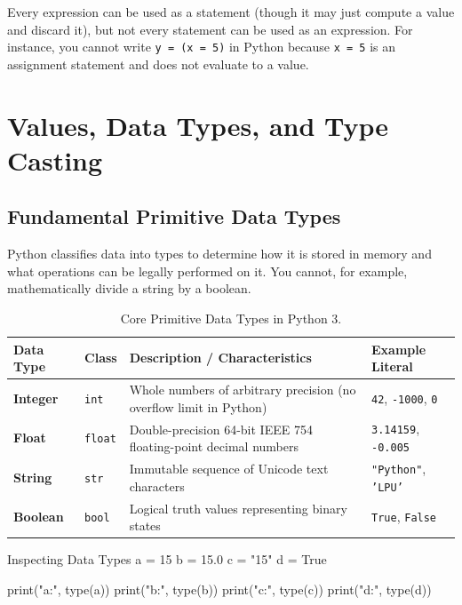 Every expression can be used as a statement (though it may just compute a value and discard it), but not every statement can be used as an expression. For instance, you cannot write \texttt{y = (x = 5)} in Python because \texttt{x = 5} is an assignment statement and does not evaluate to a value.

\section{Values, Data Types, and Type Casting}

\subsection{Fundamental Primitive Data Types}

Python classifies data into types to determine how it is stored in memory and what operations can be legally performed on it. You cannot, for example, mathematically divide a string by a boolean.

\begin{table}[htbp]
\centering
\small
\renewcommand{\arraystretch}{1.3}
\begin{tabularx}{\linewidth}{ll>{\raggedright\arraybackslash}Xl}
\toprule
\textbf{Data Type} & \textbf{Class} & \textbf{Description / Characteristics} & \textbf{Example Literal} \\
\midrule
\textbf{Integer} & \texttt{int} & Whole numbers of arbitrary precision (no overflow limit in Python) & \texttt{42}, \texttt{-1000}, \texttt{0} \\
\textbf{Float} & \texttt{float} & Double-precision 64-bit IEEE 754 floating-point decimal numbers & \texttt{3.14159}, \texttt{-0.005} \\
\textbf{String} & \texttt{str} & Immutable sequence of Unicode text characters & \texttt{"Python"}, \texttt{'LPU'} \\
\textbf{Boolean} & \texttt{bool} & Logical truth values representing binary states & \texttt{True}, \texttt{False} \\
\bottomrule
\end{tabularx}
\caption{Core Primitive Data Types in Python 3.}
\label{tab:primitive-types}
\end{table}

\begin{pythoncode}{Inspecting Data Types}
a = 15
b = 15.0
c = "15"
d = True

print("a:", type(a))
print("b:", type(b))
print("c:", type(c))
print("d:", type(d))
\end{pythoncode}

